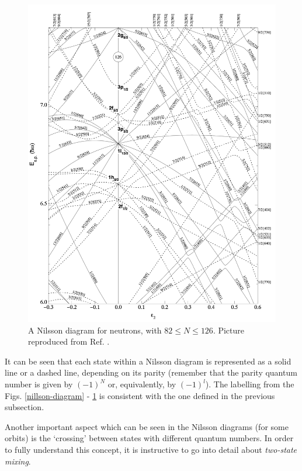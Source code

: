 \begin{figure}
    \centering
    \includegraphics[scale=0.185]{Chapters/Figures/nillson_diagram_2.png}
    \caption{A Nilsson diagram for neutrons, with $82\leq N\leq126$. %
    Picture reproduced from Ref. \cite{ragnarsson2005shapes}.}
    \label{nillson-diagram-2}
\end{figure}

It can be seen that each state within a Nilsson diagram is represented as a solid line or a dashed line, depending on its parity (remember that the parity quantum number is given by $(-1)^N$ or, equivalently, by $(-1)^l$). The labelling from the Figs. \ref{nillson-diagram} - \ref{nillson-diagram-2} is consistent with the one defined in the previous subsection.

Another important aspect which can be seen in the Nilsson diagrams (for some orbits) is the `crossing' between states with different quantum numbers. In order to fully understand this concept, it is instructive to go into detail about \emph{two-state mixing}.

